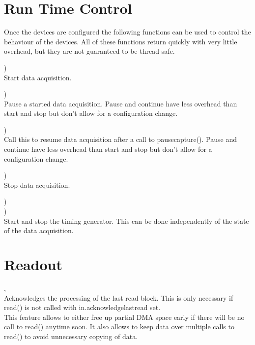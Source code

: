 
\section{Run Time Control}

Once the devices are configured the following functions can be used to control the behaviour of the devices. 
All of these functions return quickly with very little overhead, but they are not guaranteed to be thread safe.

	\device)\\
	Start data acquisition.\par

	\device)\\
	Pause a started data acquisition. 
	Pause and continue have less overhead than start and stop but don't allow for a configuration change.\par

	\device)\\
	Call this to resume data acquisition after a call to \textsf{\prefix pause\tu capture()}.
	Pause and continue have less overhead than start and stop but don't allow for a configuration change.\par

	\device)\\
	Stop data acquisition.\par
	
	\device)\\
	\device)\\
	Start and stop the timing generator. This can be done independently of the state of the data acquisition.\par	

\section{Readout}
	\device, \\
	Acknowledges the processing of the last read block. This is only necessary if \textsf{\prefix read()} is not called with 
	\textsf{in.acknowledge\tu last\tu read} set.\\
	This feature allows to either free up partial DMA space early if there will be no call to \textsf{\prefix read()} anytime soon. 
	It also allows to keep data over multiple calls to \textsf{\prefix read()} to avoid unnecessary copying of data. \par


